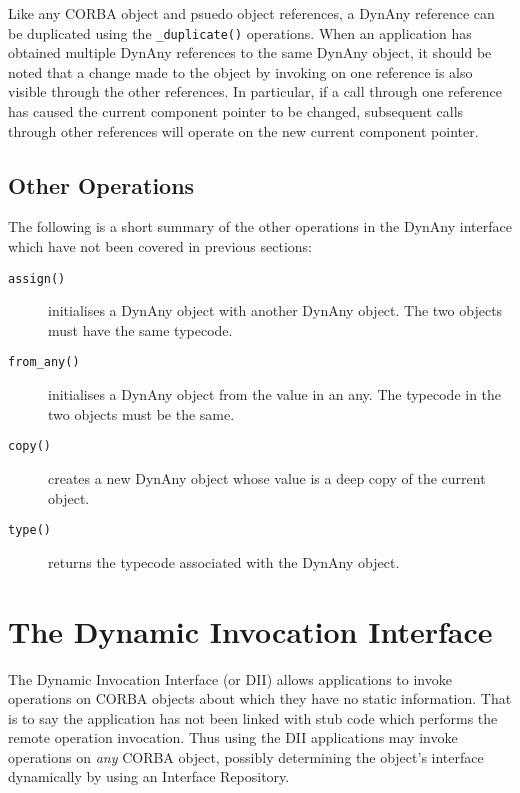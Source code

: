 \documentclass[11pt,twoside,onecolumn]{book}
\begin{document}
Like any CORBA object and psuedo object references, a DynAny reference can
be duplicated using the {\tt \_duplicate()} operations. When an application
has obtained multiple DynAny references to the same DynAny object, it
should be noted that a change made to the object by invoking on one
reference is also visible through the other references. In particular, if
a call through one reference has caused the current component pointer to be
changed, subsequent calls through other references will operate on the new
current component pointer.


\section{Other Operations}

The following is a short summary of the other operations in the DynAny
interface which have not been covered in previous sections:

\begin{description}
\item[{\tt assign()}] initialises a DynAny object with another DynAny
object. The two objects must have the same typecode.

\item[{\tt from\_any()}] initialises a DynAny object from the value in an
any. The typecode in the two objects must be the same.

\item[{\tt copy()}] creates a new DynAny object whose value is a deep copy
of the current object.

\item[{\tt type()}] returns the typecode associated with the DynAny object.

\end{description}


\chapter{The Dynamic Invocation Interface}

The Dynamic Invocation Interface (or DII) allows applications to
invoke operations on CORBA objects about which they have no static
information. That is to say the application has not been linked with
stub code which performs the remote operation invocation. Thus using
the DII applications may invoke operations on \emph{any} CORBA object,
possibly determining the object's interface dynamically by using an
Interface Repository.
\end{document}
